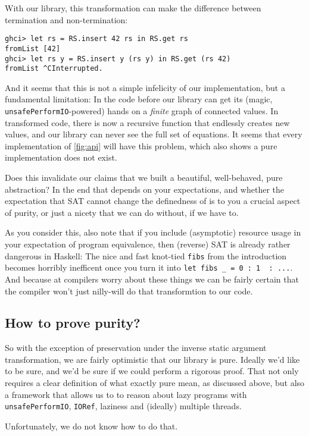 \documentclass[manuscript,screen,acmsmall]{acmart}
\begin{document}
With our library, this transformation can make the difference between termination and non-termination:
\begin{verbatim}
ghci> let rs = RS.insert 42 rs in RS.get rs
fromList [42]
ghci> let rs y = RS.insert y (rs y) in RS.get (rs 42)
fromList ^CInterrupted.
\end{verbatim}

And it seems that this is not a simple infelicity of our implementation, but a fundamental limitation: In the code before our library can get its (magic, \verb|unsafePerformIO|-powered) hands on a \emph{finite} graph of connected values. In transformed code, there is now a recursive function that endlessly creates new values, and our library can never see the full set of equations. It seems that every implementation of \cref{fig:api} will have this problem, which also shows a pure implementation does not exist.

Does this invalidate our claims that we built a beautiful, well-behaved, pure abstraction? In the end that depends on your expectations, and whether the expectation that SAT cannot change the definedness of is to you a crucial aspect of purity, or just a nicety that we can do without, if we have to.

As you consider this, also note that if you include (asymptotic) resource usage in your expectation of program equivalence, then (reverse) SAT is already rather dangerous in Haskell: The nice and fast knot-tied \verb|fibs| from the introduction becomes horribly inefficent once you turn it into \verb|let fibs _ = 0 : 1  : ...|. And because at compilers worry about these things we can be fairly certain that the compiler won't just nilly-will do that transformtion to our code.


\subsection{How to prove purity?}

So with the exception of preservation under the inverse static argument transformation, we are fairly optimistic that our library is pure. Ideally we'd like to be sure, and we’d be sure if we could perform a rigorous proof. That not only requires a clear definition of what exactly pure mean, as discussed above, but also a framework that allows us to to reason about lazy programs with \verb|unsafePerformIO|, \verb|IORef|, laziness and (ideally) multiple threads.

Unfortunately, we do not know how to do that.
\end{document}
